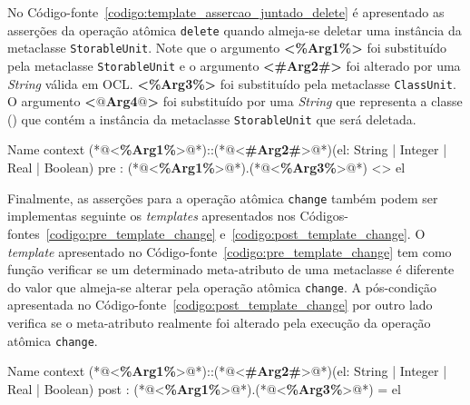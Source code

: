 No Código-fonte~\ref{codigo:template_assercao_juntado_delete} é apresentado as asserções da operação atômica \texttt{delete} quando almeja-se deletar uma instância da metaclasse \texttt{StorableUnit}. Note que o argumento \textbf{<\%Arg1\%>} foi substituído pela metaclasse \texttt{StorableUnit} e o argumento \textbf{<\#Arg2\#>} foi alterado por uma \textit{String} válida em OCL. \textbf{<\%Arg3\%>} foi substituído pela metaclasse \texttt{ClassUnit}. O argumento \textbf{<$@$Arg4$@$>} foi  substituído por uma \textit{String} que representa a classe () que contém a instância da metaclasse \texttt{StorableUnit} que será deletada. 

\begin{codigo}[caption={[\textit{Template} OCL para realizar a pré-condição da operação atômica \texttt{change}.] \textit{Template} OCL para realizar a pré-condição da operação atômica \texttt{change}.},escapeinside={(*@}{@*)}, mathescape=true, basicstyle=\footnotesize, label={codigo:pre_template_change}, language=OCL]{Name}
context (*@<\textbf{\%Arg1\%}>@*)::(*@<\textbf{\#Arg2\#}>@*)(el: String | Integer | Real | Boolean)
pre : (*@<\textbf{\%Arg1\%}>@*).(*@<\textbf{\%Arg3\%}>@*) <> el
\end{codigo}

Finalmente, as asserções para a operação atômica \texttt{change} também podem ser implementas seguinte os \textit{templates} apresentados nos Códigos-fontes~\ref{codigo:pre_template_change} e~\ref{codigo:post_template_change}. O \textit{template} apresentado no Código-fonte~\ref{codigo:pre_template_change} tem como função verificar se um determinado meta-atributo de uma metaclasse é diferente do valor que almeja-se alterar pela operação atômica \texttt{change}. A pós-condição apresentada no Código-fonte~\ref{codigo:post_template_change} por outro lado verifica se o meta-atributo realmente foi alterado pela execução da operação atômica \texttt{change}.

\begin{codigo}[caption={[\textit{Template} OCL para realizar a pós-condição da operação atômica \texttt{change}.] \textit{Template} OCL para realizar a pré-condição da operação atômica \texttt{change}.},escapeinside={(*@}{@*)}, basicstyle=\footnotesize, label={codigo:post_template_change}, language=OCL]{Name}
context (*@<\textbf{\%Arg1\%}>@*)::(*@<\textbf{\#Arg2\#}>@*)(el: String | Integer | Real | Boolean)
post : (*@<\textbf{\%Arg1\%}>@*).(*@<\textbf{\%Arg3\%}>@*) = el
\end{codigo}


